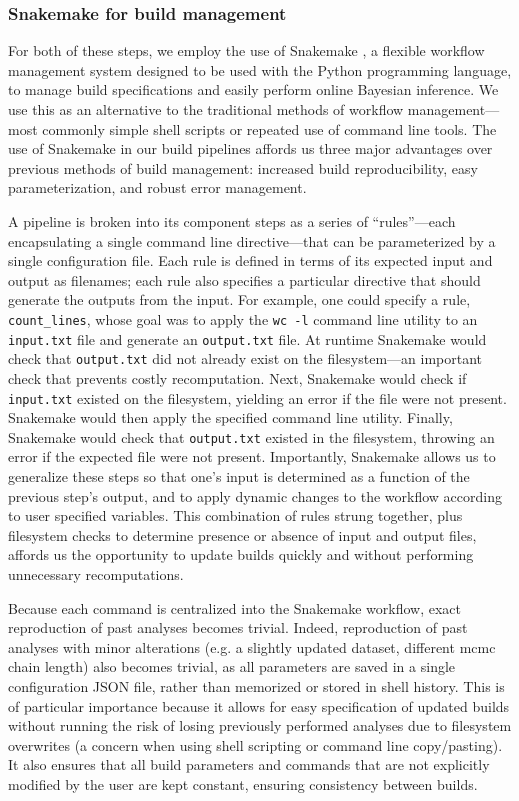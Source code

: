\subsubsection{Snakemake for build management}

For both of these steps, we employ the use of Snakemake \cite{koster2012snakemake}, a flexible workflow management system designed to be used with the Python programming language, to manage build specifications and easily perform online Bayesian inference.
We use this as an alternative to the traditional methods of workflow management---most commonly simple shell scripts or repeated use of command line tools.
The use of Snakemake in our build pipelines affords us three major advantages over previous methods of build management: increased build reproducibility, easy parameterization, and robust error management.

A pipeline is broken into its component steps as a series of ``rules''---each encapsulating a single command line directive---that can be parameterized by a single configuration file.
Each rule is defined in terms of its expected input and output as filenames; each rule also specifies a particular directive that should generate the outputs from the input.
For example, one could specify a rule, \texttt{count\_lines}, whose goal was to apply the \texttt{wc -l} command line utility to an \texttt{input.txt} file and generate an \texttt{output.txt} file.
At runtime Snakemake would check that \texttt{output.txt} did not already exist on the filesystem---an important check that prevents costly recomputation.
Next, Snakemake would check if \texttt{input.txt} existed on the filesystem, yielding an error if the file were not present.
Snakemake would then apply the specified command line utility.
Finally, Snakemake would check that \texttt{output.txt} existed in the filesystem, throwing an error if the expected file were not present.
Importantly, Snakemake allows us to generalize these steps so that one's input is determined as a function of the previous step's output, and to apply dynamic changes to the workflow according to user specified variables.
This combination of rules strung together, plus filesystem checks to determine presence or absence of input and output files, affords us the opportunity to update builds quickly and without performing unnecessary recomputations.

Because each command is centralized into the Snakemake workflow, exact reproduction of past analyses becomes trivial.
Indeed, reproduction of past analyses with minor alterations (e.g. a slightly updated dataset, different \gls{mcmc} chain length) also becomes trivial, as all parameters are saved in a single configuration JSON file, rather than memorized or stored in shell history.
This is of particular importance because it allows for easy specification of updated builds without running the risk of losing previously performed analyses due to filesystem overwrites (a concern when using shell scripting or command line copy/pasting).
It also ensures that all build parameters and commands that are not explicitly modified by the user are kept constant, ensuring consistency between builds.

